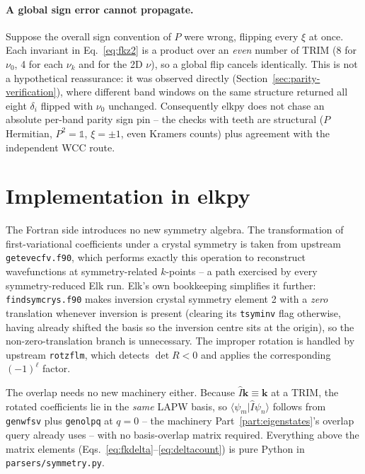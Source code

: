 \documentclass[11pt]{article}
\begin{document}
\paragraph{A global sign error cannot propagate.} Suppose the overall sign convention of
$P$ were wrong, flipping every $\xi$ at once. Each invariant in Eq.~\eqref{eq:fkz2} is a
product over an \emph{even} number of TRIM (8 for $\nu_0$, 4 for each $\nu_k$ and for the
2D $\nu$), so a global flip cancels identically. This is not a hypothetical reassurance:
it was observed directly (Section~\ref{sec:parity-verification}), where different band
windows on the same structure returned all eight $\delta_i$ flipped with $\nu_0$
unchanged. Consequently elkpy does not chase an absolute per-band parity sign pin -- the
checks with teeth are structural ($P$ Hermitian, $P^2=\mathbb 1$, $\xi=\pm1$, even
Kramers counts) plus agreement with the independent WCC route.

\section{Implementation in elkpy}

The Fortran side introduces no new symmetry algebra. The transformation of
first-variational coefficients under a crystal symmetry is taken from upstream
\texttt{getevecfv.f90}, which performs exactly this operation to reconstruct
wavefunctions at symmetry-related $k$-points -- a path exercised by every
symmetry-reduced Elk run. Elk's own bookkeeping simplifies it further:
\texttt{findsymcrys.f90} makes inversion crystal symmetry element 2 with a \emph{zero}
translation whenever inversion is present (clearing its \texttt{tsyminv} flag otherwise,
having already shifted the basis so the inversion centre sits at the origin), so the
non-zero-translation branch is unnecessary. The improper rotation is handled by upstream
\texttt{rotzflm}, which detects $\det R<0$ and applies the corresponding $(-1)^\ell$
factor.

The overlap needs no new machinery either. Because $\hat I\mathbf k\equiv\mathbf k$ at a
TRIM, the rotated coefficients lie in the \emph{same} LAPW basis, so
$\langle\psi_m|\hat I\psi_n\rangle$ follows from \texttt{genwfsv} plus \texttt{genolpq}
at $q=0$ -- the machinery Part~\ref{part:eigenstates}'s overlap query already uses -- with
no basis-overlap matrix required. Everything above the matrix elements
(Eqs.~\eqref{eq:fkdelta}--\eqref{eq:deltacount}) is pure Python in
\texttt{parsers/symmetry.py}.
\end{document}
